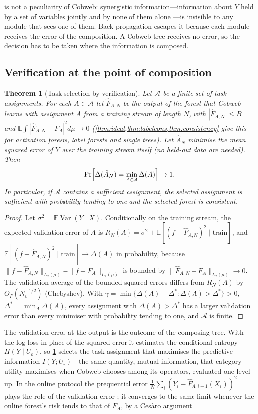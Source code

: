 \documentclass[11pt]{article}
\newtheorem{theorem}{Theorem}
\theoremstyle{definition}
\theoremstyle{remark}
\newcommand{\E}{\mathbb{E}}
\newcommand{\cA}{\mathcal{A}}
\newcommand{\Var}{\operatorname{Var}}
\begin{document}
 is not a peculiarity of Cobweb: synergistic information---information
about $Y$ held by a set of variables jointly and by none of them alone
\citep{williams2010}---is invisible to any module that sees one of them.  Back-propagation
escapes it because each module receives the error of the composition.  A Cobweb tree
receives no error, so the decision has to be taken where the information is composed.

\subsection{Verification at the point of composition}

\begin{theorem}[Task selection by verification]\label{thm:selection}
Let $\cA$ be a finite set of task assignments.  For each $A\in\cA$ let $\hat F_{A,N}$ be
the output of the forest that Cobweb learns with assignment $A$ from a training stream
of length $N$, with $|\hat F_{A,N}|\le B$ and $\E\int|\hat F_{A,N}-F_A|^2d\mu\to0$
(\cref{thm:ideal,thm:labelcons,thm:consistency} give this for activation forests, label
forests and single trees).  Let $\hat A_N$ minimise the mean squared error of $Y$ over
the training stream itself (no held-out data are needed).  Then
\[
  \Pr\Bigl[\Delta(\hat A_N)=\min_{A\in\cA}\Delta(A)\Bigr]\to1.
\]
In particular, if $\cA$ contains a sufficient assignment, the selected assignment is
sufficient with probability tending to one and the selected forest is consistent.
\end{theorem}
\begin{proof}
Let $\sigma^2=\E\Var(Y\mid X)$.  Conditionally on the training stream, the expected
validation error of $A$ is
$R_N(A)=\sigma^2+\E[(f-\hat F_{A,N})^2\mid\text{train}]$, and
$\E[(f-\hat F_{A,N})^2\mid\text{train}]\to\Delta(A)$ in probability, because
$\|f-\hat F_{A,N}\|_{L_2(\mu)}-\|f-F_A\|_{L_2(\mu)}$ is bounded by
$\|\hat F_{A,N}-F_A\|_{L_2(\mu)}\to0$.  The validation average of the bounded squared
errors differs from $R_N(A)$ by $O_P(N_v^{-1/2})$ (Chebyshev).  With
$\gamma=\min\{\Delta(A)-\Delta^*:\Delta(A)>\Delta^*\}>0$, $\Delta^*=\min_A\Delta(A)$,
every assignment with $\Delta(A)>\Delta^*$ has a larger validation error than every
minimiser with probability tending to one, and $\cA$ is finite.
\end{proof}

The validation error at the output is the outcome of the composing tree.  With the log
loss in place of the squared error it estimates the conditional entropy
$H(Y\mid U_o)$, so \cref{thm:selection} selects the task assignment that maximises the
predictive information $I(Y;U_o)$---the same quantity, mutual information, that category
utility maximises when Cobweb chooses among its operators, evaluated one level up.  In
the online protocol the prequential error $\frac1N\sum_i(Y_i-\hat F_{A,i-1}(X_i))^2$
plays the role of the validation error \citep{dawid1984}; it converges to the same limit
whenever the online forest's risk tends to that of $F_A$, by a Ces\`aro argument.
\end{document}
